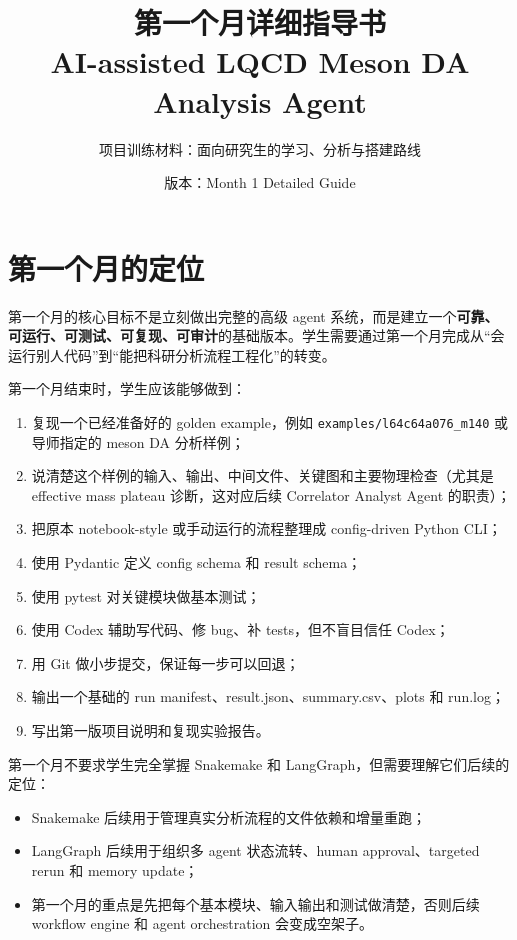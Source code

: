 \documentclass[11pt,a4paper,fontset=fandol]{ctexart}
\title{\bfseries 第一个月详细指导书\\AI-assisted LQCD Meson DA Analysis Agent}
\author{项目训练材料：面向研究生的学习、分析与搭建路线}
\date{版本：Month 1 Detailed Guide}
\begin{document}
\maketitle
\tableofcontents
\newpage

\section{第一个月的定位}

第一个月的核心目标不是立刻做出完整的高级 agent 系统，而是建立一个\textbf{可靠、可运行、可测试、可复现、可审计}的基础版本。学生需要通过第一个月完成从“会运行别人代码”到“能把科研分析流程工程化”的转变。

第一个月结束时，学生应该能够做到：

\begin{enumerate}[leftmargin=2em]
  \item 复现一个已经准备好的 golden example，例如 \lstinline|examples/l64c64a076_m140| 或导师指定的 meson DA 分析样例；
  \item 说清楚这个样例的输入、输出、中间文件、关键图和主要物理检查（尤其是 effective mass plateau 诊断，这对应后续 Correlator Analyst Agent 的职责）；
  \item 把原本 notebook-style 或手动运行的流程整理成 config-driven Python CLI；
  \item 使用 Pydantic 定义 config schema 和 result schema；
  \item 使用 pytest 对关键模块做基本测试；
  \item 使用 Codex 辅助写代码、修 bug、补 tests，但不盲目信任 Codex；
  \item 用 Git 做小步提交，保证每一步可以回退；
  \item 输出一个基础的 run manifest、result.json、summary.csv、plots 和 run.log；
  \item 写出第一版项目说明和复现实验报告。
\end{enumerate}

第一个月不要求学生完全掌握 Snakemake 和 LangGraph，但需要理解它们后续的定位：

\begin{itemize}[leftmargin=2em]
  \item Snakemake 后续用于管理真实分析流程的文件依赖和增量重跑；
  \item LangGraph 后续用于组织多 agent 状态流转、human approval、targeted rerun 和 memory update；
  \item 第一个月的重点是先把每个基本模块、输入输出和测试做清楚，否则后续 workflow engine 和 agent orchestration 会变成空架子。
\end{itemize}
\end{document}

